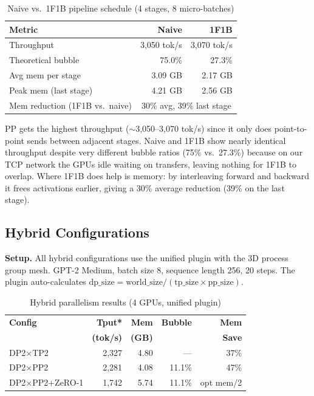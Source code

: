 \documentclass[conference]{IEEEtran}
\begin{document}
\begin{table}[h]
\centering
\caption{Naive vs.\ 1F1B pipeline schedule (4 stages, 8 micro-batches)}
\label{tab:pipeline}
\begin{tabular}{lrr}
\toprule
\textbf{Metric} & \textbf{Naive} & \textbf{1F1B} \\
\midrule
Throughput & 3,050 tok/s & 3,070 tok/s \\
Theoretical bubble & 75.0\% & 27.3\% \\
Avg mem per stage & 3.09 GB & 2.17 GB \\
Peak mem (last stage) & 4.21 GB & 2.56 GB \\
Mem reduction (1F1B vs.\ naive) & \multicolumn{2}{c}{30\% avg, 39\% last stage} \\
\bottomrule
\end{tabular}
\end{table}

PP gets the highest throughput ($\sim$3,050--3,070 tok/s) since it only does point-to-point sends between adjacent stages. Naive and 1F1B show nearly identical throughput despite very different bubble ratios (75\% vs.\ 27.3\%) because on our TCP network the GPUs idle waiting on transfers, leaving nothing for 1F1B to overlap. Where 1F1B does help is memory: by interleaving forward and backward it frees activations earlier, giving a 30\% average reduction (39\% on the last stage).

\subsection{Hybrid Configurations}

\textbf{Setup.} All hybrid configurations use the unified plugin with the 3D process group mesh. GPT-2 Medium, batch size 8, sequence length 256, 20 steps. The plugin auto-calculates $\text{dp\_size} = \text{world\_size} / (\text{tp\_size} \times \text{pp\_size})$.

\begin{table}[h]
\centering
\caption{Hybrid parallelism results (4 GPUs, unified plugin)}
\label{tab:hybrid}
\small
\begin{tabular}{lrrrr}
\toprule
\textbf{Config} & \textbf{Tput*} & \textbf{Mem} & \textbf{Bubble} & \textbf{Mem} \\
 & \textbf{(tok/s)} & \textbf{(GB)} & & \textbf{Save} \\
\midrule
DP2$\times$TP2 & 2,327 & 4.80 & --- & 37\% \\
DP2$\times$PP2 & 2,281 & 4.08 & 11.1\% & 47\% \\
DP2$\times$PP2+ZeRO-1 & 1,742 & 5.74 & 11.1\% &  opt mem/2 \\
\bottomrule
\end{tabular}
\end{table}
\end{document}
